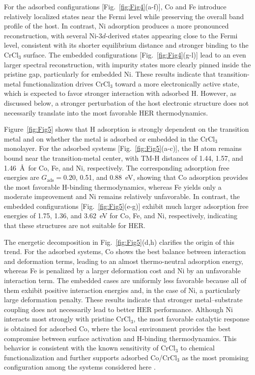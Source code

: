 \documentclass[journal=jacsat,manuscript=article]{achemso}
\begin{document}
For the adsorbed configurations [Fig.~\ref{fig:Fig4}(a-f)], Co and Fe introduce relatively localized states near the Fermi level while preserving the overall band profile of the host. In contrast, Ni adsorption produces a more pronounced reconstruction, with several Ni-$3d$-derived states appearing close to the Fermi level, consistent with its shorter equilibrium distance and stronger binding to the CrCl$_3$ surface. The embedded configurations [Fig.~\ref{fig:Fig4}(g-l)] lead to an even larger spectral reconstruction, with impurity states more clearly pinned inside the pristine gap, particularly for embedded Ni. These results indicate that transition-metal functionalization drives CrCl$_3$ toward a more electronically active state, which is expected to favor stronger interaction with adsorbed H. However, as discussed below, a stronger perturbation of the host electronic structure does not necessarily translate into the most favorable HER thermodynamics.

Figure~\ref{fig:Fig5} shows that H adsorption is strongly dependent on the transition metal and on whether the metal is adsorbed or embedded in the CrCl$_3$ monolayer. For the adsorbed systems [Fig.~\ref{fig:Fig5}(a-c)], the H atom remains bound near the transition-metal center, with TM-H distances of 1.44, 1.57, and 1.46~\AA\ for Co, Fe, and Ni, respectively. The corresponding adsorption free energies are $G_{\mathrm{ads}} = 0.20$, 0.51, and 0.88~eV, showing that Co adsorption provides the most favorable H-binding thermodynamics, whereas Fe yields only a moderate improvement and Ni remains relatively unfavorable. In contrast, the embedded configurations [Fig.~\ref{fig:Fig5}(e-g)] exhibit much larger adsorption free energies of 1.75, 1.36, and 3.62~eV for Co, Fe, and Ni, respectively, indicating that these structures are not suitable for HER.

The energetic decomposition in Fig.~\ref{fig:Fig5}(d,h) clarifies the origin of this trend. For the adsorbed systems, Co shows the best balance between interaction and deformation terms, leading to an almost thermo-neutral adsorption energy, whereas Fe is penalized by a larger deformation cost and Ni by an unfavorable interaction term. The embedded cases are uniformly less favorable because all of them exhibit positive interaction energies and, in the case of Ni, a particularly large deformation penalty. These results indicate that stronger metal--substrate coupling does not necessarily lead to better HER performance. Although Ni interacts most strongly with pristine CrCl$_3$, the most favorable catalytic response is obtained for adsorbed Co, where the local environment provides the best compromise between surface activation and H-binding thermodynamics. This behavior is consistent with the known sensitivity of CrCl$_3$ to chemical functionalization and further supports adsorbed Co/CrCl$_3$ as the most promising configuration among the systems considered here \cite{Luo2020,Wang2019,Gao2018,Mastrippolito2021,Mastrippolito2022,Zala2024}.
\end{document}
